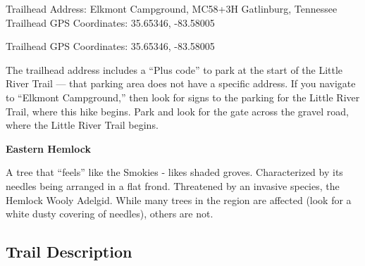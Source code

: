 \documentclass[
  letterpaper,
  DIV=11,
  numbers=noendperiod]{scrreprt}
\begin{document}
Trailhead Address: Elkmont Campground, MC58+3H Gatlinburg, Tennessee
Trailhead GPS Coordinates: 35.65346, -83.58005

Trailhead GPS Coordinates: 35.65346, -83.58005

The trailhead address includes a ``Plus code'' to park at the start of
the Little River Trail --- that parking area does not have a specific
address. If you navigate to ``Elkmont Campground,'' then look for signs
to the parking for the Little River Trail, where this hike begins. Park
and look for the gate across the gravel road, where the Little River
Trail begins.

\begin{tcolorbox}[enhanced jigsaw, arc=.35mm, leftrule=.75mm, opacityback=0, breakable, rightrule=.15mm, toprule=.15mm, colframe=quarto-callout-note-color-frame, colback=white, bottomrule=.15mm, left=2mm]
\begin{minipage}[t]{5.5mm}
\textcolor{quarto-callout-note-color}{\faInfo}
\end{minipage}%
\begin{minipage}[t]{\textwidth - 5.5mm}

\vspace{-3mm}\textbf{Eastern Hemlock}\vspace{3mm}

A tree that ``feels'' like the Smokies - likes shaded groves.
Characterized by its needles being arranged in a flat frond. Threatened
by an invasive species, the Hemlock Wooly Adelgid. While many trees in
the region are affected (look for a white dusty covering of needles),
others are not.

\end{minipage}%
\end{tcolorbox}

\subsection{Trail Description}\label{trail-description-20}
\end{document}
